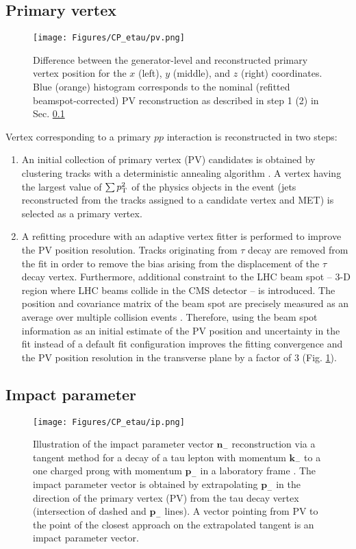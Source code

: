 \subsection{Primary vertex}\label{sec:pv}

\begin{figure}[t!]
    \centering
    \texttt{[image: Figures/CP\_etau/pv.png]}
    \caption{Difference between the generator-level and reconstructed primary vertex position for the $x$ (left), $y$ (middle), and $z$ (right) coordinates. Blue (orange) histogram corresponds to the nominal (refitted beamspot-corrected) PV reconstruction as described in step 1 (2) in Sec. \ref{sec:pv}}
    \label{fig:pv}
\end{figure}
 Vertex corresponding to a primary $pp$ interaction is reconstructed in two steps:
\begin{enumerate}
    \item An initial collection of primary vertex (PV) candidates is obtained by clustering tracks with a deterministic annealing algorithm \cite{726788}. A vertex having the largest value of $\sum p_{\text{T}}^2$ of the physics objects in the event (jets reconstructed from the tracks assigned to a candidate vertex and MET) is selected as a primary vertex.
    \item A refitting procedure with an adaptive vertex fitter \cite{Fruhwirth:2007hz} is performed to improve the PV position resolution. Tracks originating from $\tau$ decay are removed from the fit in order to remove  the bias arising from the displacement of the $\tau$ decay vertex. Furthermore, additional constraint to the LHC beam spot -- 3-D region where LHC beams collide in the CMS detector -- is introduced. The position and covariance matrix of the beam spot are precisely measured as an average over multiple collision events \cite{CMS:2014pgm}. Therefore, using the beam spot information as an initial estimate of the PV position and uncertainty in the fit instead of a default fit configuration improves the fitting convergence and the PV position resolution in the transverse plane by a factor of 3 (Fig. \ref{fig:pv}). 
\end{enumerate}

\subsection{Impact parameter}\label{sec:ip}
\begin{figure}[t!]
    \centering
    \texttt{[image: Figures/CP\_etau/ip.png]}
    \caption{Illustration of the impact parameter vector $\boldsymbol{n}_-$ reconstruction via a tangent method for a decay of a tau lepton with momentum $\boldsymbol{\text{k}}_-$ to a one charged prong with momentum $\boldsymbol{\text{p}}_-$ in a laboratory frame \cite{Berge:2008dr}. The impact parameter vector is obtained by extrapolating $\boldsymbol{\text{p}}_-$ in the direction of the primary vertex (PV) from the tau decay vertex (intersection of dashed and $\boldsymbol{\text{p}}_-$ lines). A vector pointing from PV to the point of the closest approach on the extrapolated tangent is an impact parameter vector.}
    \label{fig:ip}
\end{figure}

